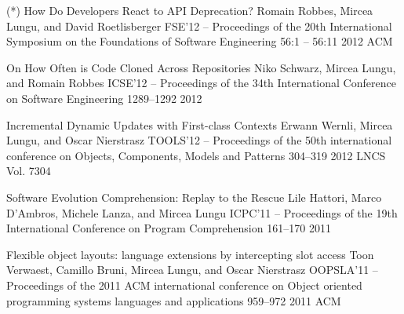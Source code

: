 \begin{enumerate}
\densepap
	{(*) How Do Developers React to API Deprecation?}
	{Romain Robbes, Mircea Lungu, and David Roetlisberger}
	{FSE'12 -- Proceedings of the 20th International Symposium on the Foundations of Software Engineering }
	{56:1 -- 56:11}
	{2012}
	{ACM}

\densepap
	{On How Often is Code Cloned Across Repositories}
	{Niko Schwarz, Mircea Lungu, and Romain Robbes}
	{ICSE'12 -- Proceedings of the 34th International Conference on Software Engineering }
	{1289--1292}
	{2012}
	{\IEEE}

\densepap
	{Incremental Dynamic Updates with First-class Contexts}
	{Erwann Wernli, Mircea Lungu, and Oscar Nierstrasz}
	{TOOLS'12 -- Proceedings of the 50th international conference on Objects, Components, Models and Patterns}
	{304--319}
	{2012}
	{LNCS Vol. 7304}





\densepap
	{Software Evolution Comprehension: Replay to the Rescue}
	{Lile Hattori, Marco D'Ambros, Michele Lanza, and Mircea Lungu}
	{ICPC'11 -- Proceedings of the 19th International Conference on Program Comprehension}
	{161--170}
	{2011}
	{\IEEE}



\densepap
	{Flexible object layouts: language extensions by intercepting slot access}
	{Toon Verwaest, Camillo Bruni, Mircea Lungu, and Oscar Nierstrasz}
	{OOPSLA'11 -- Proceedings of the 2011 ACM international conference on Object oriented programming systems languages and applications }
	{959--972}
	{2011}
	{ACM}




\end{enumerate}
